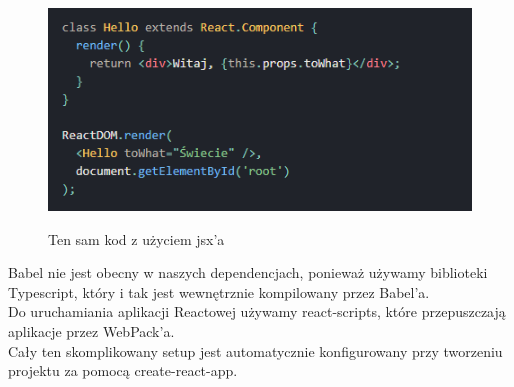 \documentclass[a4paper,11pt]{report}
\begin{document}
 \begin{figure}[H]
	\centering
	\includegraphics[scale=0.5]{implementacja/frontend/react_jsx}\\
	\caption{Ten sam kod z użyciem jsx'a}
	\label{fig:react_jsx}
\end{figure}
Babel nie jest obecny w naszych dependencjach, ponieważ używamy biblioteki Typescript\cite{typescript}, który i tak jest wewnętrznie kompilowany przez Babel'a.\\
 Do uruchamiania aplikacji Reactowej używamy react-scripts\cite{react-scripts}, które przepuszczają aplikacje przez WebPack'a.\\
 Cały ten skomplikowany setup jest automatycznie konfigurowany przy tworzeniu projektu za pomocą create-react-app.\\
\end{document}
